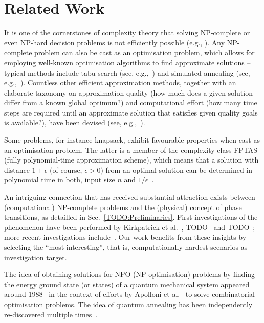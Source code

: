 
\section{Related Work}
It is one of the cornerstones of complexity theory that solving NP-complete or even NP-hard decision problems is not efficiently possible (e.g., \cite{cook1971complexity,murty1987some}). Any NP-complete problem can also be cast as an optimisation problem, which allows for employing well-known optimisation algorithms to find approximate solutions -- typical methods include tabu search (see, e.g.,~\cite{glover2013tabu, gendreau1994tabu}) and simulated annealing (see, e.g.,~\cite{kirkpatrick1983optimization, chen1995chaotic}). Countless other efficient approximation methods, together with an elaborate taxonomy on approximation quality (how much does a given solution differ from a known global optimum?) and computational effort (how many time steps are required until an approximate solution that satisfies given quality goals is available?), have been devised (see, e.g.,~\cite{NPO-Compendium}).

Some problems, for instance knapsack, exhibit favourable properties when cast as an optimisation problem. The latter is a member of the complexity class FPTAS (fully polynomial-time approximation scheme), which means that a solution with distance \(1+\epsilon\) (of course, $\epsilon > 0$) from an optimal solution can be determined in polynomial time in both, input size \(n\) and \(1/\epsilon\)~\cite{chen1995chaotic}.

An intriguing connection that has received substantial attraction exists between (computational) NP-complete problems and the (physical) concept of phase transitions, as detailled in Sec.~\ref{TODO:Preliminaries}. First investigations of the phenomenon have been performed by Kirkpatrick et al.~\cite{kirkpatrick1994critical}, TODO~\cite{TODO monasson1999determining} and TODO~\cite{TODO}; more recent investigations include~\cite{TODO, TODO, TODO}. Our work benefits from these insights by selecting the ``most interesting'', that is, computationally hardest scenarios as investigation target.

The idea of obtaining solutions for NPO (NP optimisation) problems by finding the energy ground state (or states) of a quantum mechanical system appeared around 1988~\cite{TODO: Originalpaper,albash2016adiabatic} in the context of efforts by Apolloni et al.~\cite{apolloni1989quantum,apolloni1988numerical} to solve combinatorial optimisation problems.  The idea of quantum annealing has been independently re-discovered multiple times~\cite{albash2016adiabatic,finnila1994quantum,amara1993global,kadowaki1998quantum}.

